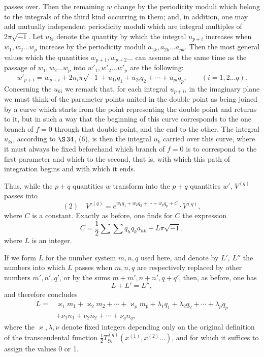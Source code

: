 \documentclass[10pt]{article}
\begin{document}
passes over. Then the remaining \(w\) change by the periodicity moduli which belong to the integrals of the third kind occurring in them; and, in addition, one may add mutually independent periodicity moduli which are integral multiples of \(2\pi\sqrt{-1}\). Let \(u_{ki}\) denote the quantity by which the integral \(u_{p+i}\) increases when \(w_1,w_2\ldots w_p\) increase by the periodicity moduli \(a_{1k},a_{2k}\ldots a_{pk}\). Then the most general values which the quantities \(w_{p+1},w_{p+2}\ldots\) can assume at the same time as the passage of \(w_1,w_2\ldots w_p\) into \(w'_1,w'_2\ldots w'_p\) are the following:
\[
w'_{p+i}=w_{p+i}+2n_i\pi\sqrt{-1}+u_{1i}q_1+u_{2i}q_2+\cdots+u_{pi}q_p,
\qquad (i=1,2\ldots q).
\]
Concerning the \(u_{ki}\) we remark that, for each integral \(u_{p+i}\), in the imaginary plane we must think of the parameter points united in the double point as being joined by a curve which starts from the point representing the double point and returns to it, but in such a way that the beginning of this curve corresponds to the one branch of \(f=0\) through that double point, and the end to the other. The integral \(u_{ki}\), according to \(\S\,34\), (6), is then the integral \(u_k\) carried over this curve, where it must always be fixed beforehand which branch of \(f=0\) is to correspond to the first parameter and which to the second, that is, with which this path of integration begins and with which it ends.

Thus, while the \(p+q\) quantities \(w\) transform into the \(p+q\) quantities \(w'\), \(V^{(q)}\) passes into
\[
(2)\quad
V'^{(q)}=e^{w_1q_1+w_2q_2+\cdots+w_pq_p+C}\cdot V^{(q)},
\]
where \(C\) is a constant. Exactly as before, one finds for \(C\) the expression
\[
C=\frac12\sum\sum q_hq_ka_{hk}+L\pi\sqrt{-1},
\]
where \(L\) is an integer.

If we form \(L\) for the number system \(m,n,q\) used here, and denote by \(L'\), \(L''\) the numbers into which \(L\) passes when \(m,n,q\) are respectively replaced by other numbers \(m',n',q'\), or by the sums \(m+m',n+n',q+q'\), then, as before, one has
\[
L+L'=L'',
\]
and therefore concludes
\[
\begin{aligned}
L={}&\varkappa_1m_1+\varkappa_2m_2+\cdots+\varkappa_pm_p
+\lambda_1q_1+\lambda_2q_2+\cdots+\lambda_pq_p\\
&+\nu_1n_1+\nu_2n_2+\cdots+\nu_qn_q,
\end{aligned}
\]
where the \(\varkappa,\lambda,\nu\) denote fixed integers depending only on the original definition of the transcendental function \(\frac12T_{\xi\eta}^{(q)}(x^{(1)},x^{(2)}\ldots)\), and for which it suffices to assign the values 0 or 1.
\end{document}
